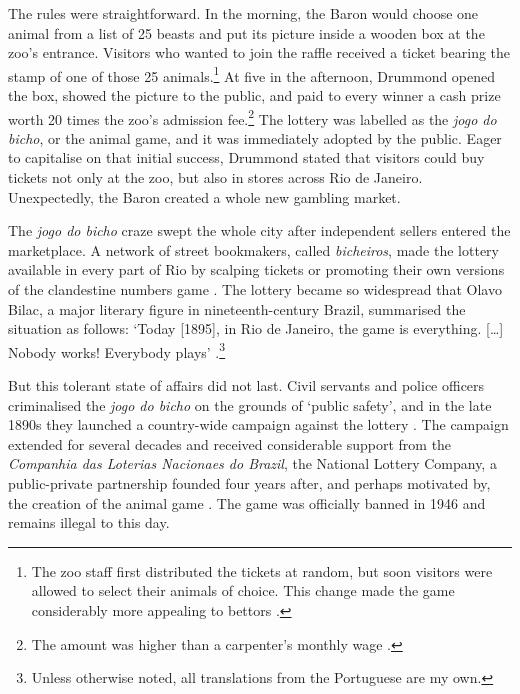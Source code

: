 \documentclass[a4paper,12pt]{article}
\begin{document}
The rules were straightforward. In the morning, the Baron would choose one animal from a list of 25 beasts and put its picture inside a wooden box at the zoo's entrance. Visitors who wanted to join the raffle received a ticket bearing the stamp of one of those 25 animals.\footnote{The zoo staff first distributed the tickets at random, but soon visitors were allowed to select their animals of choice. This change made the game considerably more appealing to bettors \citep[71--74]{da1999aguias}.} At five in the afternoon, Drummond opened the box, showed the picture to the public, and paid to every winner a cash prize worth 20 times the zoo's admission fee.\footnote{The amount was higher than a carpenter's monthly wage \citep[542]{chazkel2007beyond}.} The lottery was labelled as the \emph{jogo do bicho}, or the animal game, and it was immediately adopted by the public. Eager to capitalise on that initial success, Drummond stated that visitors could buy tickets not only at the zoo, but also in stores across Rio de Janeiro. Unexpectedly, the Baron created a whole new gambling market.

The \emph{jogo do bicho} craze swept the whole city after independent sellers entered the marketplace. A network of street bookmakers, called \emph{bicheiros}, made the lottery available in every part of Rio by scalping tickets or promoting their own versions of the clandestine numbers game  \citep[37]{chazkel2011laws}. The lottery became so widespread that Olavo Bilac, a major literary figure in nineteenth-century Brazil, summarised the situation as follows: `Today {[}1895{]}, in Rio de Janeiro, the game is everything. {[}\ldots{}{]} Nobody works! Everybody plays' \citep[43]{pacheco1957antologia}.\footnote{Unless otherwise noted, all translations from the Portuguese are my own.} 

But this tolerant state of affairs did not last. Civil servants and police officers criminalised the \emph{jogo do bicho} on the grounds of `public safety', and in the late 1890s they launched a country-wide campaign against the lottery \citep{benatte2002jogos}. The campaign extended for several decades and received considerable support from the \emph{Companhia das Loterias Nacionaes do Brazil}, the National Lottery Company, a public-private partnership founded four years after, and perhaps motivated by, the creation of the animal game \citep[82]{da1999aguias}. The game was officially banned in 1946 and remains illegal to this day.
 
\end{document}
